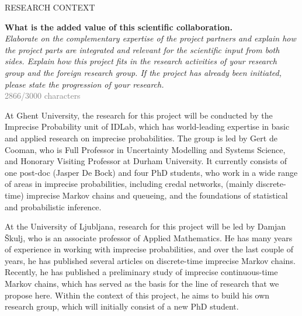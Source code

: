 \documentclass[11pt,dvipsnames,usenames,a4paper]{article}
\begin{document}



\vspace{7pt}




\vspace{5mm}

\newpage

\begin{shaded}\centering RESEARCH CONTEXT \end{shaded}
\textbf{What is the added value of this scientific collaboration.}\\
\textit{Elaborate on the complementary expertise of the project partners and explain how the project parts are integrated and relevant for the scientific input from both sides. Explain how this project fits in the research activities of your research group and the foreign research group. If the project has already been initiated, please state the progression of your research.}\\
\textcolor{Gray}{2866/3000 characters}

At Ghent University, the research for this project will be conducted by the Imprecise Probability unit of IDLab, which has world-leading expertise in basic and applied research on imprecise probabilities.
The group is led by Gert de Cooman, who is Full Professor in Uncertainty Modelling and Systems Science, and Honorary Visiting Professor at Durham University.
It currently consists of one post-doc (Jasper De Bock) and four PhD students, who work in a wide range of areas in imprecise probabilities, including credal networks, (mainly discrete-time) imprecise Markov chains and queueing, and the foundations of statistical and probabilistic inference.

At the University of Ljubljana, research for this project will be led by Damjan \v{S}kulj, who is an associate professor of Applied Mathematics. 
He has many years of experience in working with imprecise probabilities, and over the last couple of years, he has published several articles on discrete-time imprecise Markov chains. 
Recently, he has published a preliminary study of imprecise continuous-time Markov chains, which has served as the basis for the line of research that we propose here.
Within the context of this project, he aims to build his own research group, which will initially consist of a new PhD student.
\end{document}
